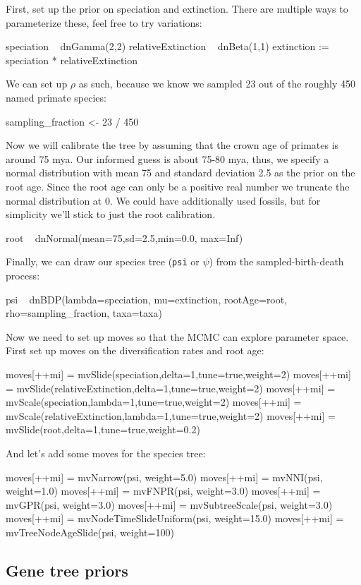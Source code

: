 \documentclass[11pt]{article}
\begin{document}
First, set up the prior on speciation and extinction. There are multiple ways
to parameterize these, feel free to try variations:
\begin{code}
speciation ~ dnGamma(2,2)
relativeExtinction ~ dnBeta(1,1)
extinction := speciation * relativeExtinction
\end{code}
We can set up $\rho$ as such, because we know we sampled 23 out of the roughly 450 named primate species:
\begin{code}
sampling_fraction <- 23 / 450
\end{code}
Now we will calibrate the tree by assuming that the crown age of primates is around 75 mya. 
Our informed guess is about 75-80 mya, thus, 
we specify a normal distribution with mean 75 and standard deviation 2.5 as the prior on the root age. 
Since the root age can only be a positive real number we truncate the normal distribution at 0.
We could have additionally used fossils, but for simplicity we'll stick to just the root calibration.
\begin{code}
root ~ dnNormal(mean=75,sd=2.5,min=0.0, max=Inf)
\end{code}
Finally, we can draw our species tree (\texttt{psi} or $\psi$)
from the sampled-birth-death process:
\begin{code}
psi ~ dnBDP(lambda=speciation, mu=extinction, rootAge=root, rho=sampling_fraction, taxa=taxa)
\end{code}
Now we need to set up moves so that the MCMC can explore parameter space.
First set up moves on the diversification rates and root age:
\begin{code}
moves[++mi] = mvSlide(speciation,delta=1,tune=true,weight=2)
moves[++mi] = mvSlide(relativeExtinction,delta=1,tune=true,weight=2)
moves[++mi] = mvScale(speciation,lambda=1,tune=true,weight=2)
moves[++mi] = mvScale(relativeExtinction,lambda=1,tune=true,weight=2)
moves[++mi] = mvSlide(root,delta=1,tune=true,weight=0.2)
\end{code}
And let's add some moves for the species tree:
\begin{code}
moves[++mi] = mvNarrow(psi, weight=5.0)
moves[++mi] = mvNNI(psi, weight=1.0)
moves[++mi] = mvFNPR(psi, weight=3.0)
moves[++mi] = mvGPR(psi, weight=3.0)
moves[++mi] = mvSubtreeScale(psi, weight=3.0)
moves[++mi] = mvNodeTimeSlideUniform(psi, weight=15.0)
moves[++mi] = mvTreeNodeAgeSlide(psi, weight=100)
\end{code}

\subsection{Gene tree priors}
\end{document}
